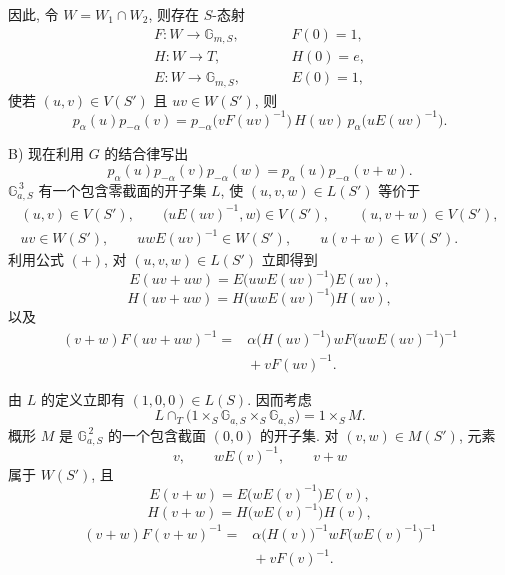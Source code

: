因此, 令 \(W=W_1\cap W_2\), 则存在 \(S\)-态射
\[
\begin{array}{lll}
  F\colon W\to\mathbb G_{m,S},&\qquad&F(0)=1,\\
  H\colon W\to T,&&H(0)=e,\\
  E\colon W\to\mathbb G_{m,S},&&E(0)=1,
\end{array}
\]
使若 \((u,v)\in V(S')\) 且 \(uv\in W(S')\), 则
\begin{equation}\tag{+}
  p_\alpha(u)p_{-\alpha}(v)
    =p_{-\alpha}\bigl(vF(uv)^{-1}\bigr)\,
       H(uv)\,p_\alpha\bigl(uE(uv)^{-1}\bigr).
\end{equation}

\textup{B)} 现在利用 \(G\) 的结合律写出
\[
  p_\alpha(u)p_{-\alpha}(v)p_{-\alpha}(w)
    =p_\alpha(u)p_{-\alpha}(v+w).
\]
\(\mathbb G_{a,S}^{\,3}\) 有一个包含零截面的开子集 \(L\), 使 \((u,v,w)\in L(S')\) 等价于
\[
\begin{gathered}
  (u,v)\in V(S'),\qquad
  \bigl(uE(uv)^{-1},w\bigr)\in V(S'),\qquad
  (u,v+w)\in V(S'),\\
  uv\in W(S'),\qquad
  uwE(uv)^{-1}\in W(S'),\qquad
  u(v+w)\in W(S').
\end{gathered}
\]
利用公式 \((+)\), 对 \((u,v,w)\in L(S')\) 立即得到
\begin{equation}\tag{1}
  E(uv+uw)=E\bigl(uwE(uv)^{-1}\bigr)E(uv),
\end{equation}
\begin{equation}\tag{2}
  H(uv+uw)=H\bigl(uwE(uv)^{-1}\bigr)H(uv),
\end{equation}
以及
\begin{equation}\tag{3}
\begin{split}
  (v+w)F(uv+uw)^{-1}
   ={}&\alpha\bigl(H(uv)^{-1}\bigr)\,
        wF\bigl(uwE(uv)^{-1}\bigr)^{-1}\\
     &{}+vF(uv)^{-1}.
\end{split}
\end{equation}

由 \(L\) 的定义立即有 \((1,0,0)\in L(S)\). 因而考虑
\[
  L\cap_T
    \bigl(1\times_S\mathbb G_{a,S}\times_S\mathbb G_{a,S}\bigr)
      =1\times_S M.
\]
概形 \(M\) 是 \(\mathbb G_{a,S}^{\,2}\) 的一个包含截面 \((0,0)\) 的开子集. 对 \((v,w)\in M(S')\), 元素
\[
  v,\qquad wE(v)^{-1},\qquad v+w
\]
属于 \(W(S')\), 且
\begin{equation}\tag{1'}
  E(v+w)=E\bigl(wE(v)^{-1}\bigr)E(v),
\end{equation}
\begin{equation}\tag{2'}
  H(v+w)=H\bigl(wE(v)^{-1}\bigr)H(v),
\end{equation}
\begin{equation}\tag{3'}
\begin{split}
  (v+w)F(v+w)^{-1}
   ={}&\alpha\bigl(H(v)\bigr)^{-1}
        wF\bigl(wE(v)^{-1}\bigr)^{-1}\\
     &{}+vF(v)^{-1}.
\end{split}
\end{equation}


